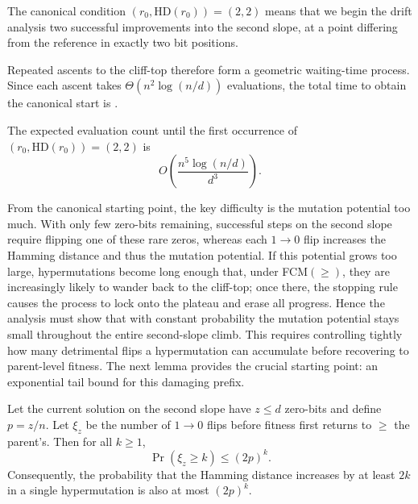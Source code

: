 The canonical condition $(r_0,\mathrm{HD}(r_0)) =
(2,2)$ means that we begin the drift analysis two successful improvements into
the second slope, at a point differing from the reference in exactly two
bit positions.

Repeated ascents to the cliff-top therefore form a geometric waiting-time 
process.  Since each ascent takes $\Theta(n^2\log(n/d))$ evaluations, the 
total time to obtain the canonical start is .

\begin{corollary}
	The expected evaluation count until the first occurrence of 
	$(r_0,\mathrm{HD}(r_0)) = (2,2)$ is 
	\[
	O\!\left(\frac{n^{5}\log(n/d)}{d^{3}}\right).
	\]
\end{corollary}


From the canonical starting point, the key difficulty is  the mutation
potential  too much.  With only few zero-bits remaining, successful
steps on the second slope require flipping one of these rare zeros, whereas each
$1\!\to0$ flip increases the Hamming distance and thus the mutation potential.
If this potential grows too large, hypermutations become long enough that, under
FCM$(\ge)$, they are increasingly likely to wander back to the cliff-top; once
there, the stopping rule causes the process to lock onto the plateau and erase
all progress.  Hence the analysis must show that with constant probability the
mutation potential stays small throughout the entire second-slope climb.  This
requires  controlling tightly how many detrimental flips a hypermutation can
accumulate before recovering to parent-level fitness.  The next lemma provides
the crucial starting point: an exponential tail bound for this damaging prefix.

\begin{lemma}%
	 \label{lem:xi-tail}
	Let the current solution on the second slope have $z\le d$ zero-bits and 
	define $p=z/n$.  
	Let $\xi_z$ be the number of $1\to0$ flips before fitness first returns to 
	$\ge$ the parent's.  
	Then for all $k\ge1$,
	\[
	\Pr(\xi_z\ge k)\le (2p)^k.
	\]
	Consequently, the probability that the Hamming distance increases by at least 
	$2k$ in a single hypermutation is also at most $(2p)^k$.
\end{lemma}

